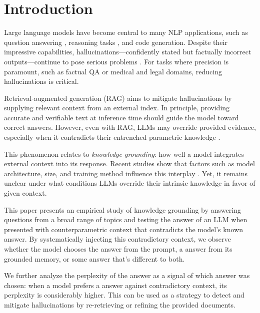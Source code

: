 \section{Introduction}

Large language models have become central to many NLP applications, such as question answering \cite{gpt3,how_can_we_know}, reasoning tasks \cite{treeofthoughts}, and code generation.
Despite their impressive capabilities, hallucinations—confidently stated but factually incorrect outputs—continue to pose serious problems \cite{how_can_we_know}.
For tasks where precision is paramount, such as factual QA or medical and legal domains, reducing hallucinations is critical.

Retrieval-augmented generation (RAG) \cite{rag} aims to mitigate hallucinations by supplying relevant context from an external index.
In principle, providing accurate and verifiable text at inference time should guide the model toward correct answers.
However, even with RAG, LLMs may override provided evidence, especially when it contradicts their entrenched parametric knowledge \cite{factual_recall,ragged}.

This phenomenon relates to \emph{knowledge grounding}: how well a model integrates external context into its response.
Recent studies show that factors such as model architecture, size, and training method influence this interplay \cite{factual_recall,flant5,llama}.
Yet, it remains unclear under what conditions LLMs override their intrinsic knowledge in favor of given context.

This paper presents an empirical study of knowledge grounding by answering questions from a broad range of topics and testing the answer of an LLM when presented with counterparametric context that contradicts the model's known answer.
By systematically injecting this contradictory context, we observe whether the model chooses the \Contextual{} answer from the prompt, a \Parametric{} answer from its grounded memory, or some \Other{} answer that's different to both.

We further analyze the perplexity of the answer as a signal of which answer was chosen: when a model prefers a \Parametric{} answer against contradictory context, its perplexity is considerably higher.
This can be used as a strategy to detect and mitigate hallucinations by re-retrieving or refining the provided documents.

